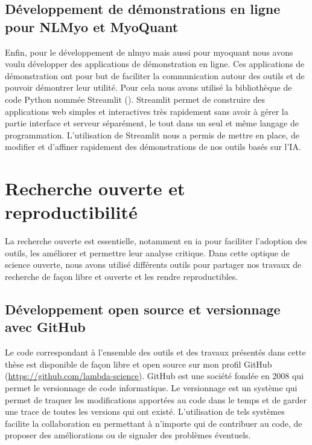 \subsection{Développement de démonstrations en ligne pour NLMyo et MyoQuant}
Enfin, pour le développement de \gls{nlmyo} mais aussi pour \gls{myoquant} nous avons voulu développer des applications de démonstration en ligne. Ces applications de démonstration ont pour but de faciliter la communication autour des outils et de pouvoir démontrer leur utilité. Pour cela nous avons utilisé la bibliothèque de code Python nommée Streamlit (\cite{adrien_treuille_streamlit_2018}). Streamlit permet de construire des applications web simples et interactives très rapidement sans avoir à gérer la partie interface et serveur séparément, le tout dans un seul et même langage de programmation. L'utilisation de Streamlit nous a permis de mettre en place, de modifier et d'affiner rapidement des démonstrations de nos outils basés sur l'IA.

\section{Recherche ouverte et reproductibilité}
La recherche ouverte est essentielle, notamment en \gls{ia} pour faciliter l'adoption des outils, les améliorer et permettre leur analyse critique. Dans cette optique de science ouverte, nous avons utilisé différents outils pour partager nos travaux de recherche de façon libre et ouverte et les rendre reproductibles.

\subsection{Développement open source et versionnage avec GitHub}
Le code correspondant à l'ensemble des outils et des travaux présentés dans cette thèse est disponible de façon libre et open source sur mon profil GitHub (\url{https://github.com/lambda-science}). GitHub est une société fondée en 2008 qui permet le versionnage de code informatique. Le versionnage est un système qui permet de traquer les modifications apportées  au code dans le temps et de garder une trace de toutes les versions qui ont existé. L'utilisation de tels systèmes facilite la collaboration en permettant à n'importe qui de contribuer au code, de proposer des améliorations ou de signaler des problèmes éventuels.

